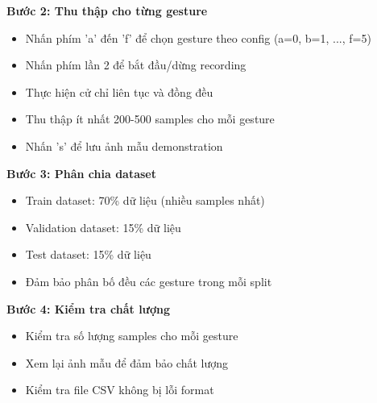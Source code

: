\textbf{Bước 2: Thu thập cho từng gesture}
\begin{itemize}
    \item Nhấn phím 'a' đến 'f' để chọn gesture theo config (a=0, b=1, ..., f=5)
    \item Nhấn phím lần 2 để bắt đầu/dừng recording
    \item Thực hiện cử chỉ liên tục và đồng đều
    \item Thu thập ít nhất 200-500 samples cho mỗi gesture
    \item Nhấn 's' để lưu ảnh mẫu demonstration
\end{itemize}

\textbf{Bước 3: Phân chia dataset}
\begin{itemize}
    \item Train dataset: 70\% dữ liệu (nhiều samples nhất)
    \item Validation dataset: 15\% dữ liệu
    \item Test dataset: 15\% dữ liệu
    \item Đảm bảo phân bố đều các gesture trong mỗi split
\end{itemize}

\textbf{Bước 4: Kiểm tra chất lượng}
\begin{itemize}
    \item Kiểm tra số lượng samples cho mỗi gesture
    \item Xem lại ảnh mẫu để đảm bảo chất lượng
    \item Kiểm tra file CSV không bị lỗi format
\end{itemize}

